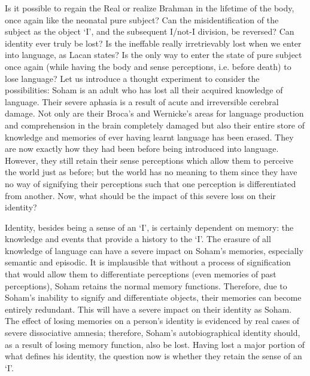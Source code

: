 Is it possible to regain the Real or realize Brahman in the lifetime of
the body, once again like the neonatal pure subject? Can the
misidentification of the subject as the object `I', and the subsequent
I/not-I division, be reversed? Can identity ever truly be lost? Is the
ineffable really irretrievably lost when we enter into language, as
Lacan states? Is the only way to enter the state of pure subject once
again (while having the body and sense perceptions, i.e. before death)
to lose language? Let us introduce a thought experiment to consider the
possibilities: Soham is an adult who has lost all their acquired
knowledge of language. Their severe aphasia is a result of acute and
irreversible cerebral damage. Not only are their Broca's and Wernicke's
areas for language production and comprehension in the brain completely
damaged but also their entire store of knowledge and memories of ever
having learnt language has been erased. They are now exactly how they
had been before being introduced into language. However, they still
retain their sense perceptions which allow them to perceive the world
just as before; but the world has no meaning to them since they have no
way of signifying their perceptions such that one perception is
differentiated from another. Now, what should be the impact of this
severe loss on their identity?

Identity, besides being a sense of an `I', is certainly dependent on
memory: the knowledge and events that provide a history to the `I'. The
erasure of all knowledge of language can have a severe impact on Soham's
memories, especially semantic and episodic. It is implausible that
without a process of signification that would allow them to
differentiate perceptions (even memories of past perceptions), Soham
retains the normal memory functions. Therefore, due to Soham's inability
to signify and differentiate objects, their memories can become entirely
redundant. This will have a severe impact on their identity as Soham.
The effect of losing memories on a person's identity is evidenced by
real cases of severe dissociative amnesia; therefore, Soham's
autobiographical identity should, as a result of losing memory function,
also be lost. Having lost a major portion of what defines his identity,
the question now is whether they retain the sense of an `I'.

